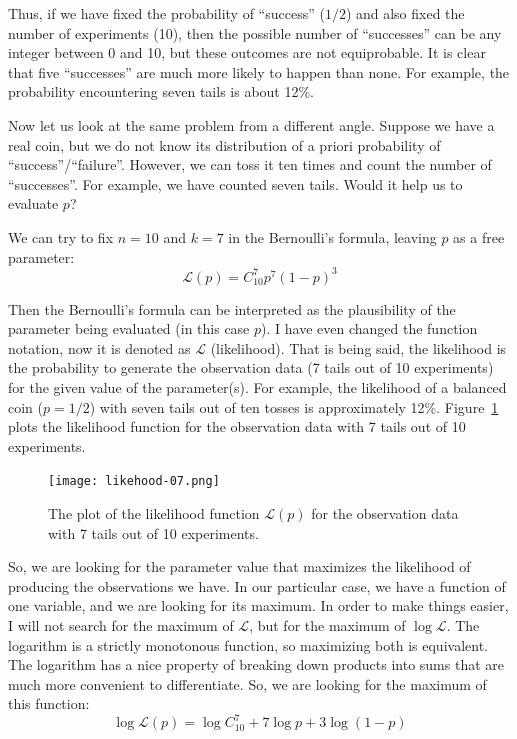 \documentclass[notitlepage,oneside]{book}
\begin{document}
Thus, if we have fixed the probability of ``success'' ($1/2$) and also fixed the number of experiments (10), 
then the possible number of ``successes'' can be any integer between 0 and 10, but these outcomes are not equiprobable. 
It is clear that five ``successes'' are much more likely to happen than none. For example, the probability encountering seven tails is about 12\%.

Now let us look at the same problem from a different angle. 
Suppose we have a real coin, but we do not know its distribution of a priori probability of ``success''/``failure''. 
However, we can toss it ten times and count the number of ``successes''. 
For example, we have counted seven tails.
Would it help us to evaluate $p$?

We can try to fix $n=10$ and $k=7$ in the Bernoulli's formula, leaving $p$ as a free parameter:
$$\mathcal{L}(p) = C_{10}^7 p^7 (1-p)^3$$

Then the Bernoulli's formula can be interpreted as the plausibility of the parameter being evaluated (in this case $p$).
I have even changed the function notation, now it is denoted as $\mathcal L$ (likelihood).
That is being said, the likelihood is the probability to generate the observation data (7 tails out of 10 experiments) for the given value of the parameter(s).
For example, the likelihood of a balanced coin ($p=1/2$) with seven tails out of ten tosses is approximately 12\%. 
Figure~\ref{fig:likelihood} plots the likelihood function for the observation data with 7 tails out of 10 experiments.

\begin{figure}[htb!]
\centering
\texttt{[image: likehood-07.png]}
\caption{The plot of the likelihood function $\mathcal{L}(p)$ for the observation data with 7 tails out of 10 experiments.}
\label{fig:likelihood}
\end{figure}

So, we are looking for the parameter value that maximizes the likelihood of producing the observations we have.
In our particular case, we have a function of one variable, and we are looking for its maximum.
In order to make things easier, I will not search for the maximum of $\mathcal L$, but for the maximum of $\log \mathcal L$.
The logarithm is a strictly monotonous function, so maximizing both is equivalent.
The logarithm has a nice property of breaking down products into sums that are much more convenient to differentiate.
So, we are looking for the maximum of this function:
$$\log \mathcal{L}(p) = \log C_{10}^7 + 7 \log p + 3\log (1-p)$$
\end{document}

